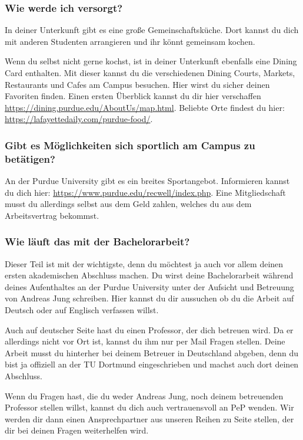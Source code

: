 \documentclass[
  paper=a4,
  fontsize=12pt,
  DIV=16,
  headheight=52pt,
  footheight=45pt,
  headinclude,
  parskip=full,
]{scrartcl}
\begin{document}
\subsubsection*{Wie werde ich versorgt?}
In deiner Unterkunft gibt es eine große Gemeinschaftsküche.
Dort kannst du dich mit anderen Studenten arrangieren und ihr könnt gemeinsam kochen.

Wenn du selbst nicht gerne kochst, ist in deiner Unterkunft ebenfalls eine
Dining Card enthalten.
Mit dieser kannst du die verschiedenen Dining Courts, Markets, Restaurants und Cafes am Campus besuchen.
Hier wirst du sicher deinen Favoriten finden.
Einen ersten Überblick kannst du dir hier verschaffen \url{https://dining.purdue.edu/AboutUs/map.html}.
Beliebte Orte findest du hier: \url{https://lafayettedaily.com/purdue-food/}.

\subsubsection*{Gibt es Möglichkeiten sich sportlich am Campus zu betätigen?}
An der Purdue University gibt es ein breites Sportangebot.
Informieren kannst du dich hier: \url{https://www.purdue.edu/recwell/index.php}.
Eine Mitgliedschaft musst du allerdings selbst aus dem Geld zahlen, welches du aus dem Arbeitsvertrag bekommst.

\subsubsection*{Wie läuft das mit der Bachelorarbeit?}
Dieser Teil ist mit der wichtigste, denn du möchtest ja auch vor allem deinen ersten akademischen Abschluss machen.
Du wirst deine Bachelorarbeit während deines Aufenthaltes an der Purdue University unter der Aufsicht und Betreuung von Andreas Jung schreiben.
Hier kannst du dir aussuchen ob du die Arbeit auf Deutsch oder auf Englisch verfassen willst.

Auch auf deutscher Seite hast du einen Professor, der dich betreuen wird.
Da er allerdings nicht vor Ort ist, kannst du ihm nur per Mail Fragen stellen.
Deine Arbeit musst du hinterher bei deinem Betreuer in Deutschland abgeben, denn du bist ja offiziell an der TU Dortmund eingeschrieben und machst auch dort deinen Abschluss.

Wenn du Fragen hast, die du weder Andreas Jung, noch deinem betreuenden Professor stellen willst, kannst du dich auch vertrauensvoll an PeP wenden.
Wir werden dir dann einen Ansprechpartner aus unseren Reihen zu Seite stellen,
der dir bei deinen Fragen weiterhelfen wird.
\end{document}
